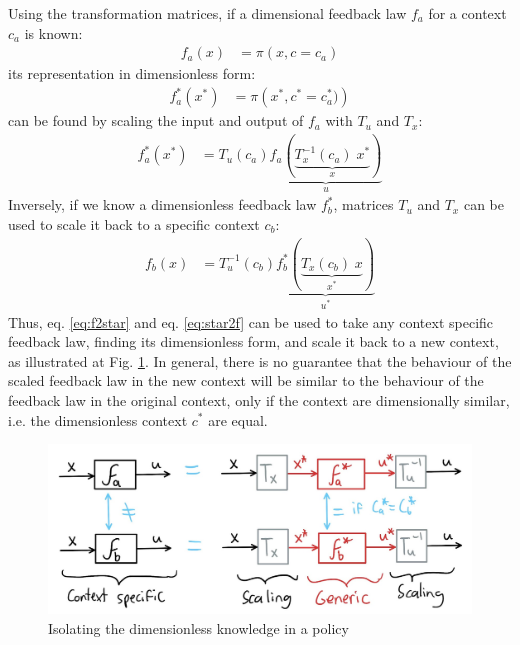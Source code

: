 Using the transformation matrices, if a dimensional feedback law $f_a$ for a context $c_a$ is known:
\begin{align}
f_a ( x ) &= \pi \left( x, c = c_a \right)
\end{align}
its representation in dimensionless form:
\begin{align}
f_a^* ( x^* ) &= \pi \left( x^*, c^* = c_a^* )\right) 
\end{align}
can be found by scaling the input and output of $f_a$ with $T_u$ and $T_x$:
\begin{align}
f_a^* ( x^* ) &= T_u(c_a) 
\underbrace{
f_a \left(  
\underbrace{
T_x^{-1}(c_a) \; x^*
}_{x}
\right)
}_{u}
\label{eq:f2star}
\end{align}
Inversely, if we know a dimensionless feedback law $f_b^*$, matrices $T_u$ and $T_x$ can be used to scale it back to a specific context $c_b$:
\begin{align}
f_b ( x ) &= T^{-1}_u(c_b) 
\underbrace{
f_b^* \left(  
\underbrace{
T_x(c_b) \; x
}_{x^*}
\right)
}_{u^*}
\label{eq:star2f}
\end{align}
Thus, eq. \eqref{eq:f2star} and eq. \eqref{eq:star2f} can be used to take any context specific feedback law, finding its dimensionless form, and scale it back to a new context, as illustrated at Fig. \ref{fig:dimpol}. In general, there is no guarantee that the behaviour of the scaled feedback law in the new context will be similar to the behaviour of the feedback law in the original context, only if the context are dimensionally similar, i.e. the dimensionless context $c^*$ are equal. 
\begin{figure}[htb]
\vspace{-5pt}
\begin{center}
\includegraphics[width=0.99\linewidth]{fig/dimpol2.jpg}
\caption{Isolating the dimensionless knowledge in a policy}\label{fig:dimpol}
\end{center}
\vspace{-15pt}
\end{figure}

